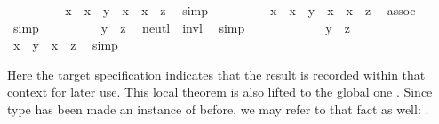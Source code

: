 \begin{isabellebody}
\ \ \ \ \ \ \isamarkupfalse%
\ \isamarkupfalse%
\ {\isachardoublequoteopen}x{\isasymdiv}\ {\isasymotimes}\ {\isacharparenleft}x\ {\isasymotimes}\ y{\isacharparenright}\ {\isacharequal}\ x{\isasymdiv}\ {\isasymotimes}\ {\isacharparenleft}x\ {\isasymotimes}\ z{\isacharparenright}{\isachardoublequoteclose}\ \isamarkupfalse%
\ simp\isanewline
\ \ \ \ \ \ \isamarkupfalse%
\ \isamarkupfalse%
\ {\isachardoublequoteopen}{\isacharparenleft}x{\isasymdiv}\ {\isasymotimes}\ x{\isacharparenright}\ {\isasymotimes}\ y\ {\isacharequal}\ {\isacharparenleft}x{\isasymdiv}\ {\isasymotimes}\ x{\isacharparenright}\ {\isasymotimes}\ z{\isachardoublequoteclose}\ \isamarkupfalse%
\ assoc\ \isamarkupfalse%
\ simp\isanewline
\ \ \ \ \ \ \isamarkupfalse%
\ \isamarkupfalse%
\ {\isachardoublequoteopen}y\ {\isacharequal}\ z{\isachardoublequoteclose}\ \isamarkupfalse%
\ neutl\ \ invl\ \isamarkupfalse%
\ simp\isanewline
\ \ \ \ \isamarkupfalse%
\isanewline
\ \ \ \ \ \ \isamarkupfalse%
\ {\isachardoublequoteopen}y\ {\isacharequal}\ z{\isachardoublequoteclose}\isanewline
\ \ \ \ \ \ \isamarkupfalse%
\ \isamarkupfalse%
\ {\isachardoublequoteopen}x\ {\isasymotimes}\ y\ {\isacharequal}\ x\ {\isasymotimes}\ z{\isachardoublequoteclose}\ \isamarkupfalse%
\ simp\isanewline
\ \ \ \ \isamarkupfalse%
%
\endisatagproof
{\isafoldproof}%
%
\isadelimproof
%
\endisadelimproof
%
\begin{isamarkuptext}%
\noindent Here the  target specification
  indicates that the result is recorded within that context for later
  use.  This local theorem is also lifted to the global one  .  Since type  has been made an instance of
   before, we may refer to that fact as well: .%
\end{isamarkuptext}%

\end{isabellebody}
